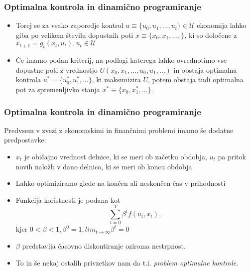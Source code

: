 \documentclass{beamer}
\begin{document}
\begin{frame}
\frametitle{Optimalna kontrola in dinamično programiranje}

\begin{itemize}
\item Torej se za vsako zaporedje kontrol $u \equiv \{u_0, u_1, \ldots, u_t\} \in \mathcal{U}$ ekonomija lahko giba po velikem številu dopustnih poti $x \equiv \{ x_0, x_1, \ldots, \}$, ki so določene z $x_{t+1} = g_t(x_t,u_t), u_t \in \mathcal{U}$ \newline
\item Če imamo podan kriterij, na podlagi katerega lahko ovrednotimo vse dopustne poti z vrednostjo $U(x_0, x_1, \ldots , u_0, u_1, \ldots)$ in obstaja optimalna kontrola $u^* = \{u_0^*, u_1^*, ...\}$, ki maksimizira $U$, potem obstaja tudi optimalna pot za spremenljivko stanja $x^* \equiv \{x_0, x_1^*,  \ldots \}$.

\end{itemize}

\end{frame}

\begin{frame}
\frametitle{Optimalna kontrola in dinamično programiranje}

Predvsem v zvezi z ekonomskimi in finančnimi problemi imamo še dodatne predpostavke:

\begin{itemize}
\item $x_t$ je običajno vrednost delnice, ki se meri ob začetku obdobja, $u_t$ pa pritok novih naložb v dano delnico, ki se meri ob koncu obdobja
\item Lahko optimiziramo glede na končen ali neskončen čas v prihodnosti
\item Funkcija koristnosti je podana kot 
\begin{equation} 
\sum_{t=0}^T \beta^t f(u_t, x_t),
\end{equation}
kjer $0 < \beta < 1, \beta^0 = 1, lim_{t\to\infty} \beta^t = 0$
\item $\beta$ predstavlja časovno diskontiranje oziroma nestrpnost.
\item To in še nekaj ostalih privzetkov nam da t.i. \textit{problem optimalne kontrole}.
\end{itemize}

\end{frame}
\end{document}
